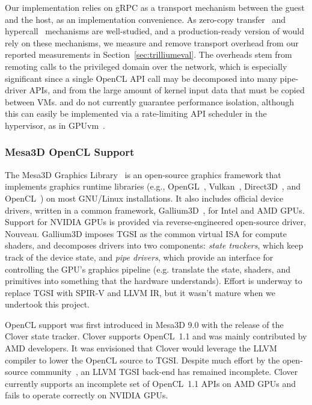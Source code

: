 Our implementation relies on gRPC as a transport mechanism between the guest
and the host, as an implementation convenience. As zero-copy transfer~\cite{
chu1996zero,tezuka1998pin} and hypercall~\cite{ram2010redesigning} mechanisms
are well-studied, and a production-ready version of \Trillium would rely on
these mechanisms, we measure and remove transport overhead from our reported
measurements in Section~\ref{sec:trilliumeval}.
The overheads stem from remoting calls to the privileged domain over the
network, which is especially significant since a single OpenCL API call may be
decomposed into many pipe-driver APIs, and from the large amount of kernel
input data that must be copied between VMs.
\XenSVGA and \Trillium do not currently guarantee performance isolation,
although this can easily be implemented via a rate-limiting API scheduler in
the hypervisor, as in GPUvm~\cite{GPUvm}.

\subsubsection{Mesa3D OpenCL Support}

The Mesa3D Graphics Library~\cite{mesa} is an open-source graphics framework
that implements graphics runtime libraries (e.g., OpenGL~\cite{openGLspec},
Vulkan~\cite{Vulkanspec}, Direct3D~\cite{directX}, and OpenCL~\cite{
stone2010opencl}) on most GNU/Linux installations. It also includes official
device drivers, written in a common framework, Gallium3D~\cite{gallium}, for
Intel and AMD GPUs. Support for NVIDIA GPUs is provided via reverse-engineered
open-source driver, Nouveau. Gallium3D imposes TGSI as the common virtual ISA
for compute shaders, and decomposes drivers into two components: \textit{state
trackers}, which keep track of the device state, and \textit{pipe drivers},
which provide an interface for controlling the GPU's graphics pipeline (e.g.
translate the state, shaders, and primitives into something that the hardware
understands). Effort is underway to replace TGSI with SPIR-V and LLVM IR, but
it wasn't mature when we undertook this project.

OpenCL support was first introduced in Mesa3D 9.0 with the release of the
Clover state tracker. Clover supports OpenCL~1.1 and was mainly contributed by
AMD developers. It was envisioned that Clover would leverage the LLVM~\cite{
lattner2004llvm} compiler to lower the OpenCL source to TGSI. Despite much
effort by the open-source community~\cite{old_llvm_tgsi1,old_llvm_tgsi2}, an
LLVM TGSI back-end has remained incomplete. Clover currently supports an
incomplete set of OpenCL~1.1 APIs on AMD GPUs and fails to operate correctly
on NVIDIA GPUs.

